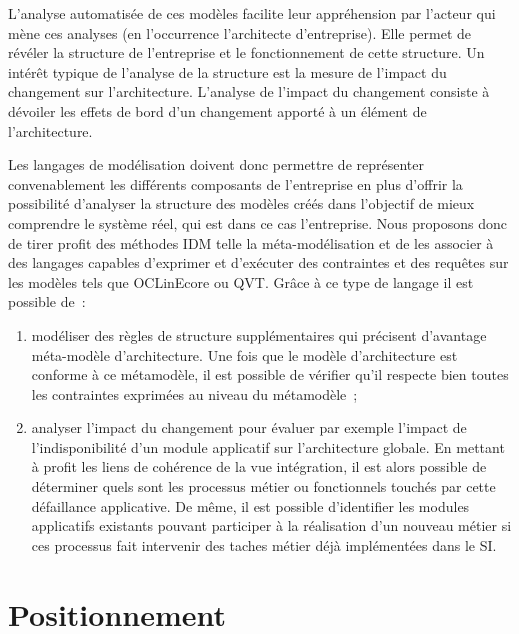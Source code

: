 L'analyse automatisée de ces modèles facilite leur appréhension par l'acteur qui
mène ces analyses (en l'occurrence l'architecte d'entreprise). Elle permet de
révéler la structure de l'entreprise et le fonctionnement de cette structure. Un
intérêt typique de l'analyse de la structure est la mesure de l'impact du
changement \cite{de2005change} sur l'architecture. L'analyse de l'impact du
changement consiste à dévoiler les effets de bord d'un changement apporté à un
élément de l'architecture.

Les langages de modélisation doivent donc permettre de représenter
convenablement les différents composants de l'entreprise en plus d'offrir la
possibilité d'analyser la structure des modèles créés dans l'objectif de mieux
comprendre le système réel, qui est dans ce cas l'entreprise. Nous proposons
donc de tirer profit des méthodes IDM telle la méta-modélisation et de les
associer à des langages capables d'exprimer et d'exécuter des contraintes et des
requêtes sur les modèles tels que OCLinEcore ou QVT. Grâce à ce type de langage
il est possible de~:

\begin{enumerate}
    \item modéliser des règles de structure supplémentaires qui précisent d'avantage méta-modèle d'architecture. Une fois
que le modèle d'architecture est conforme à ce métamodèle, il est possible de
vérifier qu'il respecte bien toutes les contraintes exprimées au niveau du
métamodèle~;
    \item analyser l'impact du changement pour évaluer par exemple
l'impact de l'indisponibilité d'un module applicatif sur l'architecture
globale. En mettant à profit les liens de cohérence de la vue intégration, il
est alors possible de déterminer quels sont les processus métier ou
fonctionnels touchés par cette défaillance applicative. De même, il est
possible d'identifier les modules applicatifs existants pouvant participer à la
réalisation d'un nouveau métier si ces processus fait intervenir des taches
métier déjà implémentées dans le SI.
    \end{enumerate}









\section{Positionnement}

